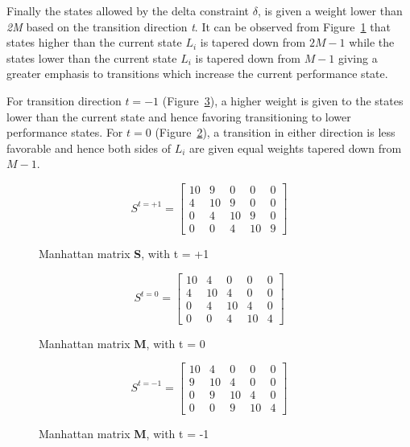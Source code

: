 Finally the states allowed by the delta constraint $\delta$, is given a weight lower than
\textit{2M} based on the transition direction \textit{t}. It can be observed from Figure~\ref{fig:ex_dmuth} 
that states higher than the current state $L_{i}$ is tapered down from $2M-1$ while the states
lower than the current state $L_{i}$ is tapered down from $M-1$ giving a greater emphasis to transitions 
which increase the current performance state.

For transition direction $t = -1$ (Figure~\ref{fig:ex_dmutl}), 
a higher weight is given to the states lower than the current state and hence favoring 
transitioning to lower performance states. For $t = 0$ (Figure~\ref{fig:ex_dmut0}), 
a transition in either direction is less favorable and hence both sides of $L_{i}$ 
are given equal weights tapered down from $M-1$.


\begin{figure}[h!]
\centering
\begin{equation*}
    S^{t = +1} = \left[
     \begin{array}{ccccc}
       10 & 9 & 0 & 0 & 0 \\
       4 & 10 & 9 & 0 & 0 \\
       0 & 4 & 10 & 9 & 0 \\
       0 & 0 & 4 & 10 & 9
     \end{array}
   \right]
\end{equation*}
\caption{Manhattan matrix \textbf{S}, with t = +1}
\label{fig:ex_dmuth}
\end{figure}

\begin{figure}[h!]
\centering
\begin{equation*}
    S^{t = 0} = \left[
     \begin{array}{ccccc}
       10 & 4 & 0 & 0 & 0 \\
       4 & 10 & 4 & 0 & 0 \\
       0 & 4 & 10 & 4 & 0 \\
       0 & 0 & 4 & 10 & 4
     \end{array}
   \right]
\end{equation*}
\caption{Manhattan matrix \textbf{M}, with t = 0}
\label{fig:ex_dmut0}
\end{figure}

\begin{figure}[h!]
\centering
\begin{equation*}
    S^{t = -1} = \left[
     \begin{array}{ccccc}
       10 & 4 & 0 & 0 & 0 \\
       9 & 10 & 4 & 0 & 0 \\
       0 & 9 & 10 & 4 & 0 \\
       0 & 0 & 9 & 10 & 4
     \end{array}
   \right]
\end{equation*}
\caption{Manhattan matrix \textbf{M}, with t = -1}
\label{fig:ex_dmutl}
\end{figure}


